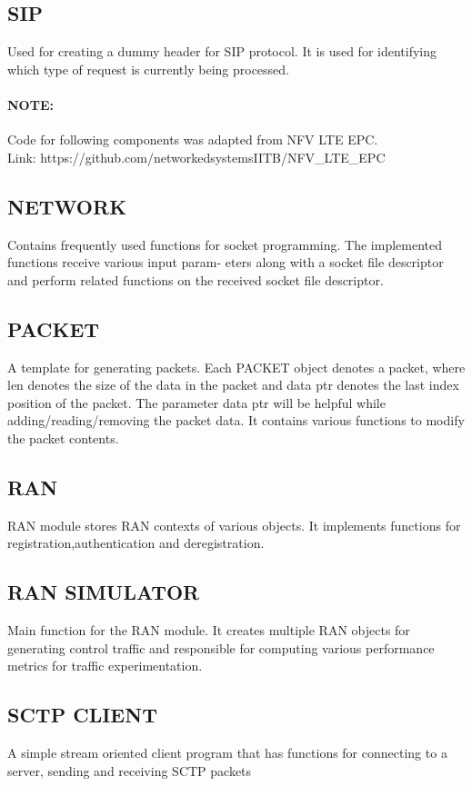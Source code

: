 \documentclass[hidelinks]{report}
\begin{document}
\subsection*{SIP}
Used for creating a dummy header for SIP protocol. It is used for identifying which type of request is currently being processed. 

\paragraph*{NOTE:}  Code for following components was adapted from NFV LTE EPC. \\
Link: https://github.com/networkedsystemsIITB/NFV\_LTE\_EPC

\subsection*{NETWORK}
Contains frequently used functions for socket programming. The implemented functions receive various input param-
eters along with a socket file descriptor and perform related functions on the received socket file descriptor. 

\subsection*{PACKET}
A template for generating packets. Each PACKET object denotes a packet, where len denotes the size of the data in
the packet and data ptr denotes the last index position of the packet. The parameter data ptr will be helpful
while adding/reading/removing the packet data. It contains various functions to modify the packet contents.

\subsection*{RAN}
RAN module stores RAN contexts of various objects. It implements functions for registration,authentication and deregistration.

\subsection*{RAN SIMULATOR}
Main function for the RAN module. It creates multiple RAN objects for generating control traffic and  responsible for computing various performance metrics for traffic experimentation.

\subsection*{SCTP CLIENT}
A simple stream oriented client program that has functions for connecting to a server, sending and receiving SCTP packets
\end{document}
